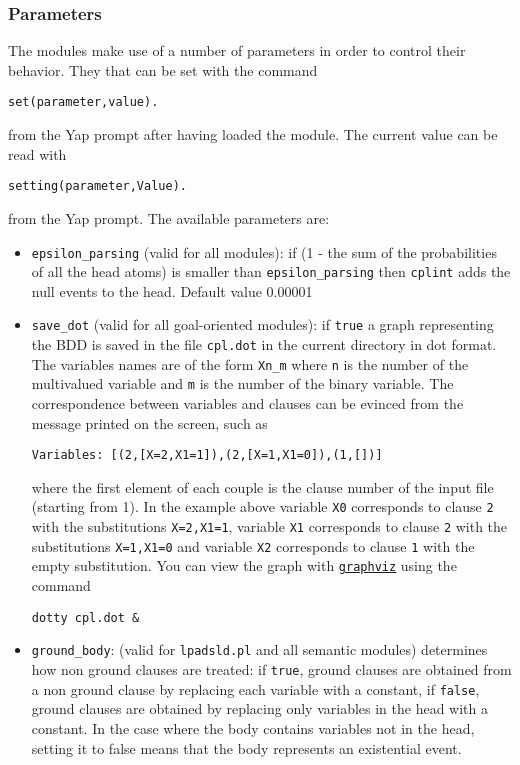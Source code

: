 \documentclass[a4paper,10pt]{scrartcl}
\begin{document}
\subsubsection{Parameters}
The modules make use of a number of parameters in order to control their behavior. They that can be set with the command
\begin{verbatim}
set(parameter,value).
\end{verbatim}
from the Yap prompt after having loaded the module.
The current value can be read with
\begin{verbatim}
setting(parameter,Value).
\end{verbatim}
from the Yap prompt.
The available parameters are:
\begin{itemize}
\item 
	 \verb|epsilon_parsing| (valid for all modules): if (1 - the sum of the probabilities of all the head atoms) is smaller than 
    \verb|epsilon_parsing|
		then \texttt{cplint} adds the null events to the head. Default value 0.00001
\item 	\verb|save_dot| (valid for all goal-oriented modules): if \texttt{true} a graph representing the BDD is saved in the file \texttt{cpl.dot} in the current directory in dot format.
		The variables names are of the form \verb|Xn_m| where \texttt{n} is the number of the multivalued
		variable and \texttt{m} is the number of the binary variable. The correspondence between variables and 
		clauses can be evinced from the message printed on the screen, such as 
\begin{verbatim}
Variables: [(2,[X=2,X1=1]),(2,[X=1,X1=0]),(1,[])]
\end{verbatim}
		where the first element of each couple is the clause number of the input file (starting from 1).
		In the example above variable \texttt{X0} corresponds to clause \texttt{2} with the substitutions \texttt{X=2,X1=1},
		variable \texttt{X1} corresponds to clause \texttt{2} with the substitutions \texttt{X=1,X1=0} and
		variable \texttt{X2} corresponds to clause \texttt{1} with the empty substitution.
		You can view the graph with  \href{http://www.graphviz.org}{\texttt{graphviz}} using the
		command
\begin{verbatim}
dotty cpl.dot &
\end{verbatim}
\item \verb|ground_body|: (valid for \texttt{lpadsld.pl} and all semantic modules) determines how non ground clauses are treated: if \texttt{true}, ground clauses are obtained from a non ground clause by replacing each variable with a constant, if \texttt{false}, ground clauses are obtained by replacing only variables in the head with a constant. In the case where the body contains variables not in the head, setting it to false means that the body represents an existential event.

\end{itemize}
\end{document}
